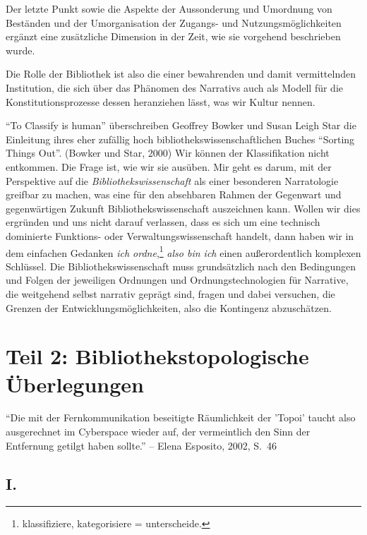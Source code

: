 \documentclass[output=paper]{langscibook}
\begin{document}
\noindent Der letzte Punkt sowie die Aspekte der Aussonderung und Umordnung von
Beständen und der Umorganisation der Zugangs- und Nutzungsmöglichkeiten
ergänzt eine zusätzliche Dimension in der Zeit, wie sie vorgehend
beschrieben wurde.

Die Rolle der Bibliothek ist also die einer bewahrenden und damit
vermittelnden Institution, die sich über das Phänomen des Narrativs auch
als Modell für die Konstitutionsprozesse dessen heranziehen lässt, was
wir Kultur nennen.

\enquote{To Classify is human} überschreiben Geoffrey Bowker und Susan
Leigh Star die Einleitung ihres eher zufällig hoch
bibliothekswissenschaftlichen Buches \enquote{Sor\-ting Things Out}.
(Bowker und Star, 2000) Wir können der Klassifikation nicht entkommen.
Die Frage ist, wie wir sie ausüben. Mir geht es darum, mit der
Perspektive auf die \emph{Bibliothekswissenschaft} als einer besonderen
Narratologie greifbar zu machen, was eine für den absehbaren Rahmen der
Gegenwart und gegenwärtigen Zukunft Bibliothekswissenschaft auszeichnen
kann. Wollen wir dies ergründen und uns nicht darauf verlassen, dass es
sich um eine technisch dominierte Funktions- oder
Verwaltungswissenschaft handelt, dann haben wir in dem einfachen
Gedanken \emph{ich ordne},\footnote{klassifiziere, kategorisiere =
  unterscheide.} \emph{also bin ich} einen außerordentlich komplexen
Schlüssel. Die Bibliothekswissenschaft muss grundsätzlich nach den
Bedingungen und Folgen der jeweiligen Ordnungen und Ordnungstechnologien
für Narrative, die weitgehend selbst narrativ geprägt sind, fragen und
dabei versuchen, die Grenzen der Entwicklungsmöglichkeiten, also die
Kontingenz abzuschätzen.

\hypertarget{teil-2-bibliothekstopologische-uxfcberlegungen}{%
\section*{Teil 2: Bibliothekstopologische
Überlegungen}\label{teil-2-bibliothekstopologische-uxfcberlegungen}}

\enquote{Die mit der Fernkommunikation beseitigte Räumlichkeit der
'Topoi' taucht also ausgerechnet im Cyberspace wieder auf, der
vermeintlich den Sinn der Entfernung getilgt haben sollte.} -- Elena
Esposito, 2002, S.~46

\hypertarget{i.}{%
\subsection*{I.}\label{i.}}
\end{document}
